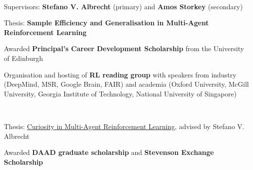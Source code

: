 \documentclass[]{lukas-cv-openfont}
\begin{document}

\noindent
{}
\\
\begin{tightitemize}{1.7em}
    \item Supervisors: \textbf{Stefano V. Albrecht} (primary) and \textbf{Amos Storkey} (secondary)
    \item Thesis: \textbf{Sample Efficiency and Generalisation in Multi-Agent Reinforcement Learning}
    \item Awarded \textbf{Principal's Career Development Scholarship} from the University of Edinburgh
    \item Organisation and hosting of \textbf{RL reading group} with speakers from industry (DeepMind, MSR, Google Brain, FAIR) and academia (Oxford University, McGill University, Georgia Institute of Technology, National University of Singapore)

\end{tightitemize}
\sectionsep

\noindent
{}
\\
\begin{tightitemize}{1.7em}
    \item Thesis: \href{https://www.lukaschaefer.com/assets/files/msc_thesis.pdf}{Curiosity in Multi-Agent Reinforcement Learning}, advised by Stefano V. Albrecht
    \item Awarded \textbf{DAAD graduate scholarship} and \textbf{Stevenson Exchange Scholarship} 
\end{tightitemize}
\sectionsep
\end{document}
